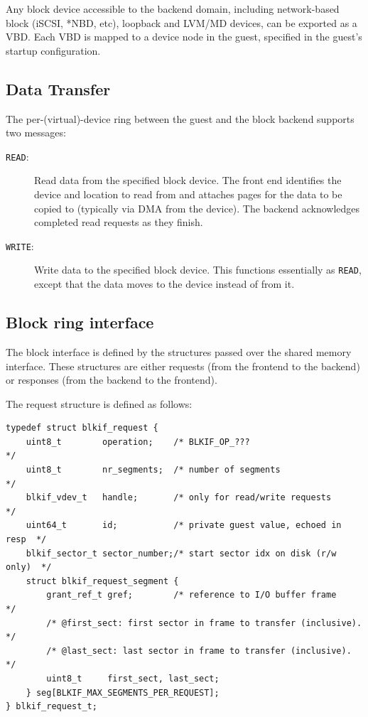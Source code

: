 \documentclass[11pt,twoside,final,openright,a4paper]{report}
\begin{document}
Any block device accessible to the backend domain, including
network-based block (iSCSI, *NBD, etc), loopback and LVM/MD devices,
can be exported as a VBD.  Each VBD is mapped to a device node in the
guest, specified in the guest's startup configuration.

\subsection{Data Transfer}

The per-(virtual)-device ring between the guest and the block backend
supports two messages:

\begin{description}
\item [{\small {\tt READ}}:] Read data from the specified block
  device.  The front end identifies the device and location to read
  from and attaches pages for the data to be copied to (typically via
  DMA from the device).  The backend acknowledges completed read
  requests as they finish.

\item [{\small {\tt WRITE}}:] Write data to the specified block
  device.  This functions essentially as {\small {\tt READ}}, except
  that the data moves to the device instead of from it.
\end{description}


\subsection{Block ring interface}

The block interface is defined by the structures passed over the
shared memory interface.  These structures are either requests (from
the frontend to the backend) or responses (from the backend to the
frontend).

The request structure is defined as follows:

\scriptsize
\begin{verbatim}
typedef struct blkif_request {
    uint8_t        operation;    /* BLKIF_OP_???                         */
    uint8_t        nr_segments;  /* number of segments                   */
    blkif_vdev_t   handle;       /* only for read/write requests         */
    uint64_t       id;           /* private guest value, echoed in resp  */
    blkif_sector_t sector_number;/* start sector idx on disk (r/w only)  */
    struct blkif_request_segment {
        grant_ref_t gref;        /* reference to I/O buffer frame        */
        /* @first_sect: first sector in frame to transfer (inclusive).   */
        /* @last_sect: last sector in frame to transfer (inclusive).     */
        uint8_t     first_sect, last_sect;
    } seg[BLKIF_MAX_SEGMENTS_PER_REQUEST];
} blkif_request_t;
\end{verbatim}
\normalsize
\end{document}
